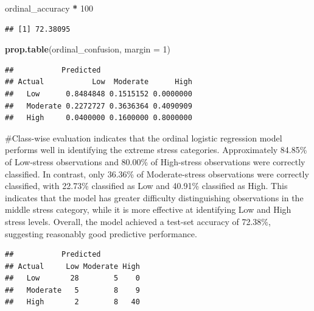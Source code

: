 \documentclass[
]{article}
\newenvironment{Shaded}{\begin{snugshade}}{\end{snugshade}}
\newcommand{\AttributeTok}[1]{\textcolor[rgb]{0.13,0.29,0.53}{#1}}
\newcommand{\DecValTok}[1]{\textcolor[rgb]{0.00,0.00,0.81}{#1}}
\newcommand{\FunctionTok}[1]{\textcolor[rgb]{0.13,0.29,0.53}{\textbf{#1}}}
\newcommand{\NormalTok}[1]{#1}
\newcommand{\SpecialCharTok}[1]{\textcolor[rgb]{0.81,0.36,0.00}{\textbf{#1}}}
\begin{document}
\begin{Shaded}
\begin{Highlighting}[]
\NormalTok{ordinal\_accuracy }\SpecialCharTok{*} \DecValTok{100}
\end{Highlighting}
\end{Shaded}

\begin{verbatim}
## [1] 72.38095
\end{verbatim}

\begin{Shaded}
\begin{Highlighting}[]
\FunctionTok{prop.table}\NormalTok{(ordinal\_confusion, }\AttributeTok{margin =} \DecValTok{1}\NormalTok{)}
\end{Highlighting}
\end{Shaded}

\begin{verbatim}
##           Predicted
## Actual           Low  Moderate      High
##   Low      0.8484848 0.1515152 0.0000000
##   Moderate 0.2272727 0.3636364 0.4090909
##   High     0.0400000 0.1600000 0.8000000
\end{verbatim}

\#Class-wise evaluation indicates that the ordinal logistic regression
model performs well in identifying the extreme stress categories.
Approximately 84.85\% of Low-stress observations and 80.00\% of
High-stress observations were correctly classified. In contrast, only
36.36\% of Moderate-stress observations were correctly classified, with
22.73\% classified as Low and 40.91\% classified as High. This indicates
that the model has greater difficulty distinguishing observations in the
middle stress category, while it is more effective at identifying Low
and High stress levels. Overall, the model achieved a test-set accuracy
of 72.38\%, suggesting reasonably good predictive performance.

\begin{Shaded}
\end{Shaded}

\begin{verbatim}
##           Predicted
## Actual     Low Moderate High
##   Low       28        5    0
##   Moderate   5        8    9
##   High       2        8   40
\end{verbatim}
\end{document}
